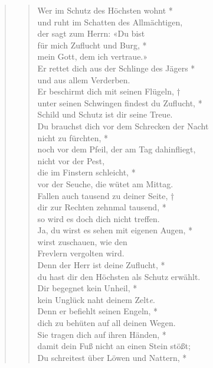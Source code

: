 \begin{quote}
 
\begin{verse}
 

Wer im Schutz des Höchsten wohnt *\\ 
und ruht im Schatten des Allmächtigen,\\
\vin der sagt zum Herrn:  «Du bist  \\ \vin für mich Zuflucht und Burg, *\\
\vin mein Gott, dem ich vertraue.»\\
Er rettet dich aus der Schlinge des Jägers *\\
und aus allem Verderben.\\
\vin Er beschirmt dich mit seinen Flügeln, †\\
\vin unter seinen Schwingen findest du Zuflucht, *\\
\vin Schild und Schutz ist dir seine Treue.\\
Du brauchst dich vor dem Schrecken der Nacht\\ nicht zu fürchten, *\\
noch vor dem Pfeil, der am Tag dahinfliegt,\\
\vin nicht vor der Pest, \\ \vin die im Finstern schleicht, *\\
\vin vor der Seuche, die wütet am Mittag.\\
Fallen auch tausend zu deiner Seite, †\\
dir zur Rechten zehnmal tausend, *\\
so wird es doch dich nicht treffen.\\
\vin Ja, du wirst es sehen mit eigenen Augen, *\\
\vin wirst zuschauen, wie den \\ \vin Frevlern vergolten wird.\\
Denn der Herr ist deine Zuflucht, *\\
du hast dir den Höchsten als Schutz erwählt.\\
\vin Dir begegnet kein Unheil, *\\
\vin kein Unglück naht deinem Zelt\textit{e}.\\
Denn er befiehlt seinen Engeln, *\\
 dich zu behüten auf all deinen Wegen.\\
\vin Sie tragen dich auf ihren Händen, *\\
\vin damit dein Fuß nicht an einen Stein stößt;\\
Du schreitest über Löwen und Nattern, *\\

\end{verse}
\end{quote}
